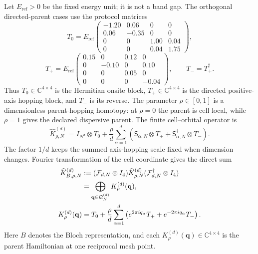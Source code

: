 \documentclass[11pt]{article}
\newcommand{\C}{\mathbb C}
\begin{document}
Let $E_{\mathrm{ref}}>0$ be the fixed energy unit; it is not a band gap. The orthogonal
directed-parent cases use the protocol matrices
\begin{equation}
 T_0=E_{\mathrm{ref}}
 \begin{pmatrix}
 -1.20&0.06&0&0\\
 0.06&-0.35&0&0\\
 0&0&1.00&0.04\\
 0&0&0.04&1.75
 \end{pmatrix},
 \label{eq:exact-onsite-block}
\end{equation}
\begin{equation}
 T_+=E_{\mathrm{ref}}
 \begin{pmatrix}
 0.15&0&0.12&0\\
 0&-0.10&0&0.10\\
 0&0&0.05&0\\
 0&0&0&-0.04
 \end{pmatrix},
 \qquad T_-=T_+^\dagger.
 \label{eq:exact-directed-hopping-block}
\end{equation}
Thus $T_0\in\C^{4\times4}$ is the Hermitian onsite block,
$T_+\in\C^{4\times4}$ is the directed positive-axis hopping block, and $T_-$ is its
reverse. The parameter $\rho\in[0,1]$ is a dimensionless parent-hopping homotopy: at
$\rho=0$ the parent is cell local, while $\rho=1$ gives the declared dispersive parent.
The finite cell--orbital operator is
\begin{equation}
 \widehat K_{\rho,N}^{(d)}
 =I_{N^d}\otimes T_0+
 \frac{\rho}{d}\sum_{\alpha=1}^d
 \left(\mathsf S_{\alpha,N}\otimes T_+
 +\mathsf S_{\alpha,N}^\dagger\otimes T_-\right).
 \label{eq:kronecker-parent}
\end{equation}
The factor $1/d$ keeps the summed axis-hopping scale fixed when dimension changes.
Fourier transformation of the cell coordinate gives the direct sum
\begin{align}
 \widehat K_{B,\rho,N}^{(d)}
 &:=(\mathcal F_{d,N}\otimes I_4)\widehat K_{\rho,N}^{(d)}
 (\mathcal F_{d,N}^\dagger\otimes I_4)\notag\\
 &=\bigoplus_{\mathbf q\in\mathcal Q_N^{(d)}}
 K_\rho^{(d)}(\mathbf q),
 \label{eq:bloch-map}\\
 K_\rho^{(d)}(\mathbf q)
 &=T_0+\frac{\rho}{d}\sum_{\alpha=1}^d
 \left(e^{2\pi iq_\alpha}T_+
       +e^{-2\pi iq_\alpha}T_-\right).
 \label{eq:bloch-fiber-definition}
\end{align}
Here $B$ denotes the Bloch representation, and each
$K_\rho^{(d)}(\mathbf q)\in\C^{4\times4}$ is the parent Hamiltonian at one reciprocal
mesh point.
\end{document}

